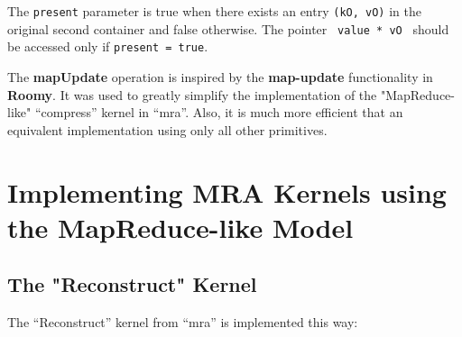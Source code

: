 \documentclass{article}
\begin{document}
\begin{itemize}
    The {\tt present} parameter is true when there exists an entry {\tt (kO,
vO)} in the original second container and false otherwise. The pointer {\tt
value * vO } should be accessed only if {\tt present = true}.

    The {\bf mapUpdate} operation is inspired by the {\bf map-update}
    functionality in {\bf Roomy}. It was used to greatly simplify
    the implementation of the "MapReduce-like" ``compress'' kernel in ``mra''.
    Also, it is much more efficient that an equivalent implementation
    using only all other primitives.

\end{itemize}

\section{Implementing MRA Kernels using the MapReduce-like Model}
\label{sec:Implementation}

\subsection{The "Reconstruct" Kernel}
\label{subsec:Reconstruct}

The ``Reconstruct'' kernel from ``mra'' is implemented this way:
\end{document}
